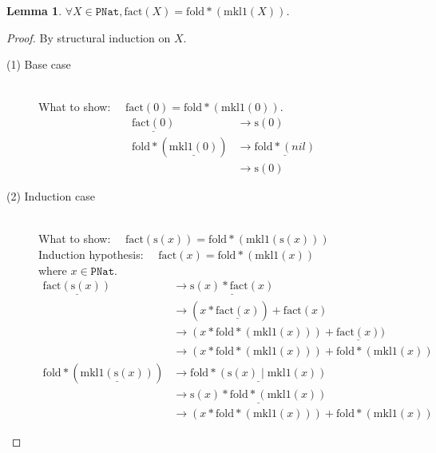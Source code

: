 \documentclass[12pt, a4paper]{article}
\newtheorem{lemma}[theorem]{Lemma}
\newcommand{\rel}[1]{\mathrel{#1}}
\newcommand{\rmx}[1]{\mathrm{#1}}
\newcommand{\larrow}{\longrightarrow}
\newcommand{\under}{\underline}
\begin{document}
\begin{lemma}
\label{lm1}
$\forall X \in \mathtt{PNat}, \rmx{fact}(X) = \rmx{fold*}(\rmx{mkl1}(X))$.
\end{lemma}
\begin{proof}
By structural induction on $X$.

\begin{description}

\item[(1) Base case]~\\
\noindent
What to show: $\quad\rmx{fact}(0) = \rmx{fold*}(\rmx{mkl1}(0))$.
\begin{align*}
\under{\rmx{fact}(0)}
	&\larrow \rmx{s}(0) \tag{by fact1} \\
\rmx{fold*}(\under{\rmx{mkl1}(0)})
	&\larrow \under{\rmx{fold*}(nil)} \tag{by mkl1-1} \\
	&\larrow \rmx{s}(0) \tag{by fold*-1}
\end{align*}

\item[(2) Induction case]~\\
What to show: $\quad\rmx{fact}(\rmx{s}(x)) = \rmx{fold*}(\rmx{mkl1}(\rmx{s}(x)))$ \\
Induction hypothesis: $\quad\rmx{fact}(x) = \rmx{fold*}(\rmx{mkl1}(x))$  \\
where $x \in \mathtt{PNat}$.
\begin{align*}
\under{\rmx{fact}(\rmx{s}(x))} 
	&\larrow \under{\rmx{s}(x) \rel{*} \rmx{fact}(x)} \tag{by fact2} \\
	&\larrow (x \rel{*} \under{\rmx{fact}(x)}) \rel{+} \rmx{fact}(x) \tag{by *2} \\
	&\larrow (x \rel{*} \rmx{fold*}(\rmx{mkl1}(x))) \rel{+} \under{\rmx{fact}(x)}) \tag{by IH} \\
	&\larrow (x \rel{*} \rmx{fold*}(\rmx{mkl1}(x))) \rel{+} \rmx{fold*}(\rmx{mkl1}(x)) \tag{by IH} \\
\rmx{fold*}(\under{\rmx{mkl1}(\rmx{s}(x))})
	&\larrow \under{\rmx{fold*}(\rmx{s}(x) \rel{|} \rmx{mkl1}(x))} \tag{by mkl1-2} \\
	&\larrow \under{\rmx{s}(x) \rel{*} \rmx{fold*}(\rmx{mkl1}(x))} \tag{by fold*-2} \\
	&\larrow (x \rel{*} \rmx{fold*}(\rmx{mkl1}(x))) \rel{+} \rmx{fold*}(\rmx{mkl1}(x)) \tag{by *2}
\end{align*}

\end{description}
\end{proof}
\end{document}
